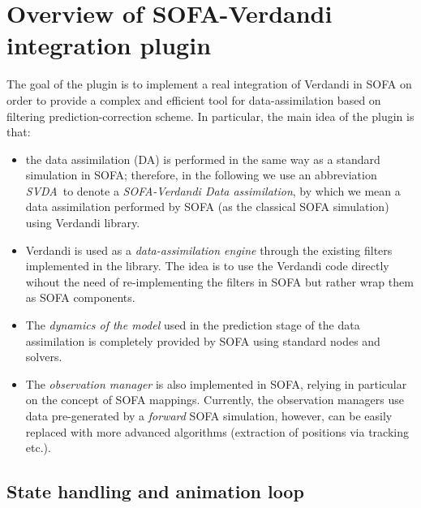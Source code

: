\documentclass[10pt]{article}
\def\svda{\textit{SVDA}}
\begin{document}
\section{Overview of SOFA-Verdandi integration plugin}
\label{s:overview}
The goal of the plugin is to implement a real integration of Verdandi in SOFA on order to provide a complex and efficient tool for data-assimilation
based on filtering 
prediction-correction scheme.
In particular, the main idea of the plugin is that:
\begin{itemize}
\item the data assimilation (DA) is performed in the same way as a standard simulation in SOFA; therefore, in the following we use an abbreviation
\svda\ to denote a \emph{SOFA-Verdandi Data assimilation}, 
by which we mean a data assimilation performed by SOFA (as the classical SOFA simulation) using Verdandi library.
\item Verdandi is used as a \emph{data-assimilation engine} through the existing filters implemented in the library. The idea is to use the Verdandi
code directly wihout the need of re-implementing the filters in SOFA but rather wrap them as SOFA components.
\item The \emph{dynamics of the model} used in the prediction stage of the data assimilation is completely provided by SOFA using standard nodes and
solvers. 
\item The \emph{observation manager} is also implemented in SOFA, relying in particular on the concept of SOFA mappings. Currently, the observation
managers use data pre-generated by a \emph{forward} SOFA simulation, however, can be easily replaced with more advanced algorithms (extraction of
positions via tracking etc.).
\end{itemize}

\subsection{State handling and animation loop}
\end{document}
